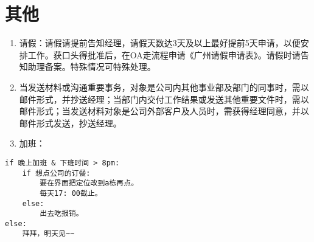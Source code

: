 \documentclass[]{book}
\begin{document}
\hypertarget{section-4}{%
\chapter{其他}\label{section-4}}

\begin{enumerate}
\def\labelenumi{\arabic{enumi}.}
\item
  请假：请假请提前告知经理，请假天数达3天及以上最好提前5天申请，以便安排工作。获口头得批准后，在OA走流程申请《广州请假申请表》。请假时请告知助理备案。特殊情况可特殊处理。
\item
  当发送材料或沟通重要事务，对象是公司内其他事业部及部门的同事时，需以邮件形式，并抄送经理；当部门内交付工作结果或发送其他重要文件时，需以邮件形式；当发送材料对象是公司外部客户及人员时，需获得经理同意，并以邮件形式发送，抄送经理。
\item
  加班：
\end{enumerate}

\begin{verbatim}
if 晚上加班 & 下班时间 > 8pm:
    if 想点公司的订餐:
        要在界面把定位改到a栋再点。
        每天17: 00截止。
    else:
        出去吃报销。
else:
    拜拜，明天见~~
\end{verbatim}


\end{document}
